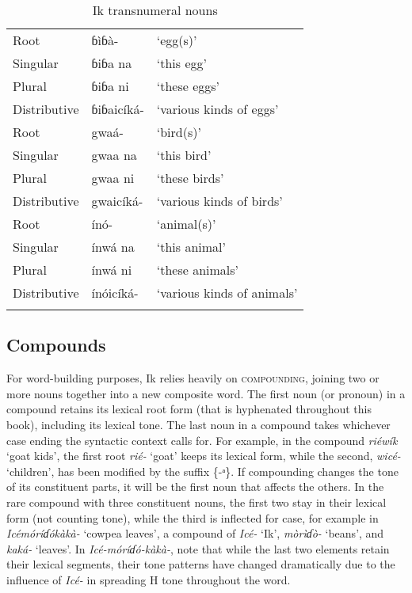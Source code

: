 \begin{table}
\caption{Ik transnumeral nouns}
\label{tab:nouns:trans}
\begin{tabularx}{\textwidth}{XXl}
\lsptoprule
Root & ɓìɓà- & ‘egg(s)’\\
Singular & ɓiɓa na & ‘this egg’\\
Plural & ɓiɓa ni & ‘these eggs’\\
Distributive & ɓiɓaicíká- & ‘various kinds of eggs’\\
\tablevspace
Root & gwaá- & ‘bird(s)’\\
Singular & gwaa na & ‘this bird’\\
Plural & gwaa ni & ‘these birds’\\
Distributive & gwaicíká- & ‘various kinds of birds’\\
\tablevspace
Root & ínó- & ‘animal(s)’\\
Singular & ínwá na & ‘this animal’\\
Plural & ínwá ni & ‘these animals’\\
Distributive & ínóicíká- & ‘various kinds of animals’\\
\lspbottomrule
\end{tabularx}
\end{table}



\subsection{Compounds}\label{sec:4.3}


For word-building purposes, Ik relies heavily on \textsc{compounding}, joining two or more nouns together into a new composite word. The first noun (or pronoun) in a compound retains its lexical root form (that is hyphenated throughout this book), including its lexical tone. The last noun in a compound takes whichever case ending the syntactic context calls for. For example, in the compound \textit{riéwík\ᵃ} ‘goat kids’, the first root \textit{rié-} ‘goat’ keeps its lexical form, while the second, \textit{wicé-} ‘children’, has been modified by the  suffix \{-ᵃ\}. If compounding changes the tone of its constituent parts, it will be the first noun that affects the others. In the rare compound with three constituent nouns, the first two stay in their lexical form (not counting tone), while the third is inflected for case, for example in \textit{Icémóríɗókàkà-} ‘cowpea leaves’, a compound of \textit{Icé-} ‘Ik’, \textit{mòrìɗò-} ‘beans’, and \textit{kaká-} ‘leaves’. In \textit{Icé-móríɗó-kàkà-}, note that while the last two elements retain their lexical segments, their tone patterns have changed dramatically due to the influence of \textit{Icé-} in spreading H tone throughout the word.

